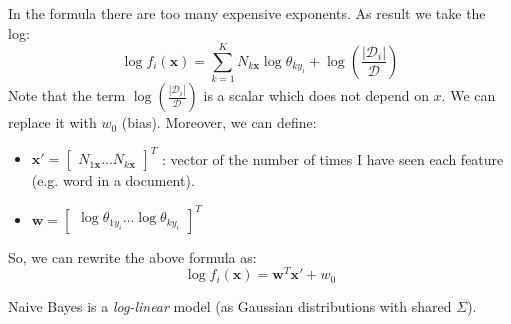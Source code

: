 In the formula there are too many expensive exponents. As result we take the log:
\begin{equation*}
	\log{f_i(\pmb{x})}= \sum_{k=1}^{K}N_{k \pmb{x}}\log{\theta_{k y_i}}+ \log{(\frac{|\mathcal{D}_{i}|}{\mathcal{D}})}
\end{equation*}
Note that the term $\log{(\frac{|\mathcal{D}_{i}|}{\mathcal{D}})}$ is a scalar
which does not depend on $x$. We can replace it with $w_{0}$ (bias). Moreover, we
can define:
\begin{itemize}
	\item $\pmb{x}' =
		\begin{bmatrix}
			N_{1 \pmb{x}}\hdots N_{k \pmb{x}}
		\end{bmatrix}^{T}$ : vector of the number of times I have seen each feature (e.g.
		word in a document).

	\item $\pmb{w}=
		\begin{bmatrix}
			\log{\theta_{1 y_i}} \hdots \log{\theta_{k y_i}}
		\end{bmatrix}^{T}$
\end{itemize}

So, we can rewrite the above formula as:
\[
	\log{f_i(\pmb{x})}= \pmb{w}^{T}\pmb{x}' + w_{0}
\]

Naive Bayes is a \textit{log-linear} model (as Gaussian distributions with
shared $\Sigma$).